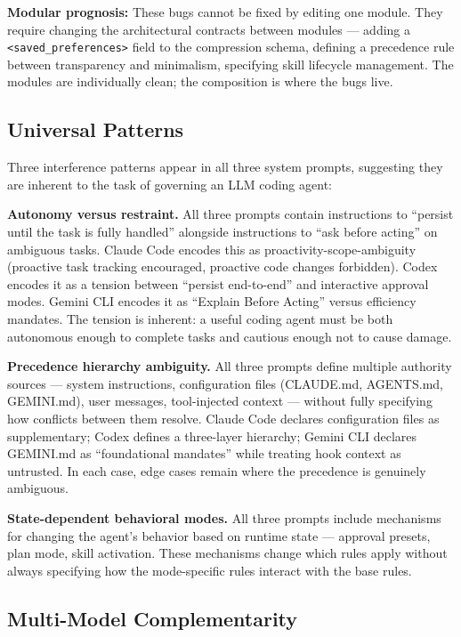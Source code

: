 \textbf{Modular prognosis:} These bugs cannot be fixed by editing one
module. They require changing the architectural contracts between
modules --- adding a
\texttt{<saved\_preferences>} field to the
compression schema, defining a precedence rule between transparency and
minimalism, specifying skill lifecycle management. The modules are
individually clean; the composition is where the bugs live.

\subsection{Universal Patterns}

Three interference patterns appear in all three system prompts,
suggesting they are inherent to the task of governing an LLM coding
agent:

\textbf{Autonomy versus restraint.} All three prompts contain
instructions to ``persist until the task is fully handled'' alongside
instructions to ``ask before acting'' on ambiguous tasks. Claude Code
encodes this as proactivity-scope-ambiguity (proactive task tracking
encouraged, proactive code changes forbidden). Codex encodes it as a
tension between ``persist end-to-end'' and interactive approval modes.
Gemini CLI encodes it as ``Explain Before Acting'' versus efficiency
mandates. The tension is inherent: a useful coding agent must be both
autonomous enough to complete tasks and cautious enough not to cause
damage.

\textbf{Precedence hierarchy ambiguity.} All three prompts define
multiple authority sources --- system instructions, configuration files
(CLAUDE.md, AGENTS.md, GEMINI.md), user messages, tool-injected context
--- without fully specifying how conflicts between them resolve. Claude
Code declares configuration files as supplementary; Codex defines a
three-layer hierarchy; Gemini CLI declares GEMINI.md as ``foundational
mandates'' while treating hook context as untrusted. In each case, edge
cases remain where the precedence is genuinely ambiguous.

\textbf{State-dependent behavioral modes.} All three prompts include
mechanisms for changing the agent's behavior based on runtime state ---
approval presets, plan mode, skill activation. These mechanisms change
which rules apply without always specifying how the mode-specific rules
interact with the base rules.

\subsection{Multi-Model Complementarity}

